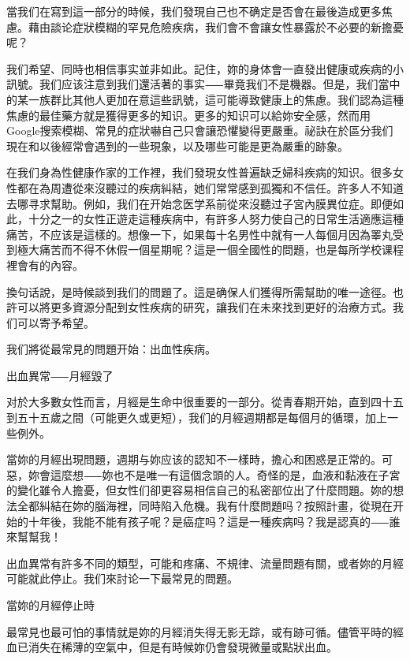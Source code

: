 \documentclass[12pt,UTF8]{ctexbook}
\begin{document}
當我们在寫到這一部分的時候，我们發現自己也不确定是否會在最後造成更多焦慮。藉由談论症狀模糊的罕見危險疾病，我们會不會讓女性暴露於不必要的新擔憂呢？

我们希望、同時也相信事实並非如此。記住，妳的身体會一直發出健康或疾病的小訊號。我们应该注意到我们還活著的事实⸺畢竟我们不是機器。但是，我们當中的某一族群比其他人更加在意這些訊號，這可能導致健康上的焦慮。我们認為這種焦慮的最佳藥方就是獲得更多的知识。更多的知识可以給妳安全感，然而用Google搜索模糊、常見的症狀嚇自己只會讓恐懼變得更嚴重。祕訣在於區分我们現在和以後經常會遇到的一些現象，以及哪些可能是更為嚴重的跡象。

在我们身為性健康作家的工作裡，我们發現女性普遍缺乏婦科疾病的知识。很多女性都在為周遭從來沒聽过的疾病糾結，她们常常感到孤獨和不信任。許多人不知道去哪寻求幫助。例如，我们在开始念医学系前從來沒聽过子宮內膜異位症。即便如此，十分之一的女性正遊走這種疾病中，有許多人努力使自己的日常生活適應這種痛苦，不应该是這樣的。想像一下，如果每十名男性中就有一人每個月因為睪丸受到極大痛苦而不得不休假一個星期呢？這是一個全國性的問題，也是每所学校课程裡會有的內容。

換句话說，是時候談到我们的問題了。這是确保人们獲得所需幫助的唯一途徑。也許可以將更多資源分配到女性疾病的研究，讓我们在未來找到更好的治療方式。我们可以寄予希望。

我们將從最常見的問題开始：出血性疾病。





出血異常⸺月經毀了




对於大多數女性而言，月經是生命中很重要的一部分。從青春期开始，直到四十五到五十五歲之間（可能更久或更短），我们的月經週期都是每個月的循環，加上一些例外。

當妳的月經出現問題，週期与妳应该的認知不一樣時，擔心和困惑是正常的。可惡，妳會這麼想⸺妳也不是唯一有這個念頭的人。奇怪的是，血液和黏液在子宮的變化雖令人擔憂，但女性们卻更容易相信自己的私密部位出了什麼問題。妳的想法全都糾結在妳的腦海裡，同時陷入危機。我有什麼問題吗？按照計畫，從現在开始的十年後，我能不能有孩子呢？是癌症吗？這是一種疾病吗？我是認真的⸺誰來幫幫我！

出血異常有許多不同的類型，可能和疼痛、不規律、流量問題有關，或者妳的月經可能就此停止。我们來討论一下最常見的問題。





當妳的月經停止時




最常見也最可怕的事情就是妳的月經消失得无影无踪，或有跡可循。儘管平時的經血已消失在稀薄的空氣中，但是有時候妳仍會發現微量或點狀出血。
\end{document}
